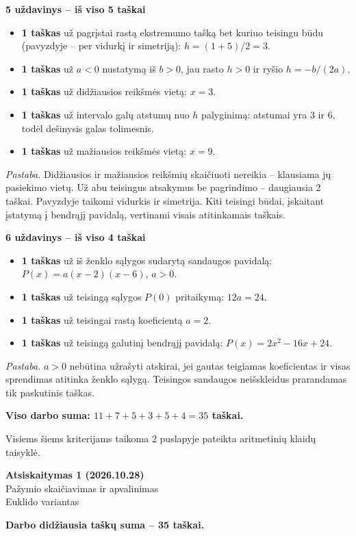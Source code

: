 \documentclass[11pt]{article}
\newcommand{\antraste}[1]{\begin{center}\Large\textbf{Atsiskaitymas 1 (2026.10.28)}\\\large #1\\\normalsize Euklido variantas\end{center}}
\newcommand{\sk}[1]{\par\medskip\textbf{#1}\par}
\begin{document}
\sk{5 uždavinys -- iš viso 5 taškai}
\begin{itemize}
\item \textbf{1 taškas} už pagrįstai rastą ekstremumo tašką bet kuriuo teisingu būdu (pavyzdyje -- per vidurkį ir simetriją):
$h=(1+5)/2=3$.
\item \textbf{1 taškas} už $a<0$ nustatymą iš $b>0$, jau rasto $h>0$ ir ryšio $h=-b/(2a)$.
\item \textbf{1 taškas} už didžiausios reikšmės vietą:
$x=3$.
\item \textbf{1 taškas} už intervalo galų atstumų nuo $h$ palyginimą: atstumai yra $3$ ir $6$, todėl dešinysis galas tolimesnis.
\item \textbf{1 taškas} už mažiausios reikšmės vietą:
$x=9$.
\end{itemize}
\textit{Pastaba.} Didžiausios ir mažiausios reikšmių skaičiuoti nereikia -- klausiama jų pasiekimo vietų. Už abu teisingus atsakymus be pagrindimo -- daugiausia 2 taškai. Pavyzdyje taikomi vidurkis ir simetrija. Kiti teisingi būdai, įskaitant įstatymą į bendrąjį pavidalą, vertinami visais atitinkamais taškais.
\begin{center}\end{center}

\sk{6 uždavinys -- iš viso 4 taškai}
\begin{itemize}
\item \textbf{1 taškas} už iš ženklo sąlygos sudarytą sandaugos pavidalą:
$P(x)=a(x-2)(x-6)$, $a>0$.
\item \textbf{1 taškas} už teisingą sąlygos $P(0)$ pritaikymą:
$12a=24$.
\item \textbf{1 taškas} už teisingai rastą koeficientą $a=2$.
\item \textbf{1 taškas} už teisingą galutinį bendrąjį pavidalą:
$P(x)=2x^2-16x+24$.
\end{itemize}
\textit{Pastaba.} $a>0$ nebūtina užrašyti atskirai, jei gautas teigiamas koeficientas ir visas sprendimas atitinka ženklo sąlygą. Teisingos sandaugos neišskleidus prarandamas tik paskutinis taškas.
\begin{center}\end{center}
\medskip\textbf{Viso darbo suma: $11+7+5+3+5+4=35$ taškai.}

Visiems šiems kriterijams taikoma 2 puslapyje pateikta aritmetinių klaidų taisyklė.
\newpage
\antraste{Pažymio skaičiavimas ir apvalinimas}
\textbf{Darbo didžiausia taškų suma -- 35 taškai.}
\end{document}

